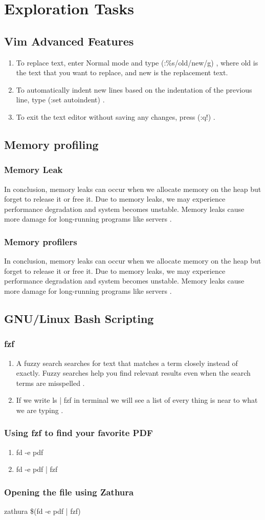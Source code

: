\documentclass{article}
\begin{document}
\section{Exploration Tasks}
\subsection{Vim Advanced Features}
\begin{enumerate}
    \item{To replace text, enter Normal mode and type (:\%s/old/new/g) , where old is the text that you want to replace, and new is the replacement text.}
    \item{To automatically indent new lines based on the indentation of the previous line, type (:set autoindent) .}
    \item{To exit the text editor without saving any changes, press (:q!) .}
\end{enumerate}
\subsection{Memory profiling}
\subsubsection{Memory Leak}
In conclusion, memory leaks can occur when we allocate memory on the heap but forget to release it or free it. Due to memory leaks, we may experience performance degradation and system becomes unstable. Memory leaks cause more damage for long-running programs like servers .
\subsubsection{Memory profilers}
In conclusion, memory leaks can occur when we allocate memory on the heap but forget to release it or free it. Due to memory leaks, we may experience performance degradation and system becomes unstable. Memory leaks cause more damage for long-running programs like servers .
\subsection{GNU/Linux Bash Scripting}
\subsubsection{fzf}
\begin{enumerate}
    \item{A fuzzy search searches for text that matches a term closely instead of exactly. Fuzzy searches help you find relevant results even when the search terms are misspelled .}
    \item{If we write ls | fzf in terminal we will see a list of every thing is near to what we are typing .}
\end{enumerate}
\subsubsection{Using fzf to find your favorite PDF}
\begin{enumerate}
    \item{fd -e pdf }
    \item{fd -e pdf | fzf}
\end{enumerate}
\subsubsection{Opening the file using Zathura}
zathura \$(fd -e pdf | fzf)
\end{document}

